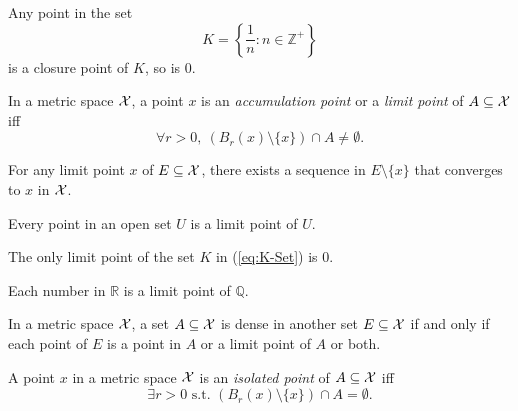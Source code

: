 \begin{exm}
  Any point in the set
   \begin{equation}
     \label{eq:K-Set}
     K=\left\{\frac{1}{n}: n\in \mathbb{Z}^+\right\}
   \end{equation}
   is a closure point of $K$,
   so is 0.
\end{exm}

\begin{defn}
  \label{def:limitPointMetricSpace}
  In a metric space ${\cal X}$, a point $x$ 
   is an \emph{accumulation point}
   or a \emph{limit point} of $A\subseteq {\cal X}$ iff
  \begin{equation}
    \label{eq:accumulationPointMetricSpace}
    \forall r>0,\ \left(B_r(x)\setminus\{x\}\right)\cap A
    \ne \emptyset. 
  \end{equation}
\end{defn}

\begin{lem}
  \label{lem:limitPointImpliesConvergence}
  For any limit point $x$ of $E\subseteq {\cal X}$,
  there exists a sequence in $E\setminus \{x\}$
  that converges to $x$ in ${\cal X}$.
\end{lem}

\begin{exm}
  Every point in an open set $U$ is a limit point of $U$. 
\end{exm}

\begin{exm}
  The only limit point of the set $K$ in (\ref{eq:K-Set}) is 0.
\end{exm}

\begin{exm}
  Each number in $\mathbb{R}$ 
   is a limit point of $\mathbb{Q}$.
\end{exm}

\begin{lem}
  \label{lem:denseSet}
  In a metric space ${\cal X}$,
  a set $A\subseteq {\cal X}$ is dense
  in another set $E\subseteq{\cal X}$
  if and only if %
  each point of $E$ is a point in $A$
  or a limit point of $A$ or both.
\end{lem}

\begin{defn}
  A point $x$ in a metric space ${\cal X}$
   is an \emph{isolated point} of $A\subseteq {\cal X}$ iff
  \begin{equation}
    \label{eq:isolatedPointMetricSpace}
    \exists r>0 \text{ s.t. } \left(B_r(x)\setminus\{x\}\right)\cap A
    = \emptyset. 
  \end{equation}
\end{defn}

